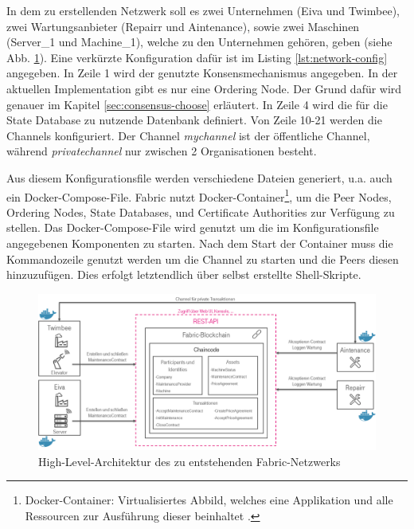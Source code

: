 In dem zu erstellenden Netzwerk soll es zwei Unternehmen (Eiva und Twimbee), zwei Wartungsanbieter (Repairr und Aintenance), sowie zwei Maschinen (Server\_1 und Machine\_1), welche zu den Unternehmen gehören, geben (siehe Abb. \ref{fig:architecture-high}). Eine verkürzte Konfiguration dafür ist im Listing \ref{lst:network-config} angegeben. In Zeile 1 wird der genutzte Konsensmechanismus angegeben. In der aktuellen Implementation gibt es nur eine Ordering Node. Der Grund dafür wird genauer im Kapitel \ref{sec:consensus-choose} erläutert. In Zeile 4 wird die für die State Database zu nutzende Datenbank definiert. Von Zeile 10-21 werden die Channels konfiguriert. Der Channel \textit{mychannel} ist der öffentliche Channel, während \textit{privatechannel} nur zwischen 2 Organisationen besteht. 

Aus diesem Konfigurationsfile werden verschiedene Dateien generiert, u.a. auch ein Docker-Compose-File. Fabric nutzt Docker-Container\footnote{Docker-Container: Virtualisiertes Abbild, welches eine Applikation und alle Ressourcen zur Ausführung dieser beinhaltet \cite{DockerTeamWhatcontainer2017}.}, um die Peer Nodes, Ordering Nodes, State Databases, und Certificate Authorities zur Verfügung zu stellen. Das Docker-Compose-File wird genutzt um die im Konfigurationsfile angegebenen Komponenten zu starten. Nach dem Start der Container muss die Kommandozeile genutzt werden um die Channel zu starten und die Peers diesen hinzuzufügen. Dies erfolgt letztendlich über selbst erstellte Shell-Skripte. 

\begin{figure}[!htbp]
    \centering
      \includegraphics[width=1.0\textwidth,angle=0]{images/architecture_highlevel}
       \caption{High-Level-Architektur des zu entstehenden Fabric-Netzwerks}
      \label{fig:architecture-high}
\end{figure}

